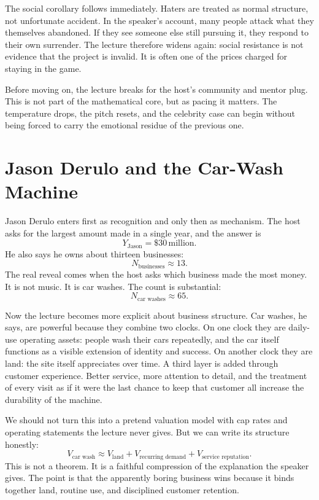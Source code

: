 The social corollary follows immediately. Haters are treated as normal structure, not unfortunate accident. In the speaker's account, many people attack what they themselves abandoned. If they see someone else still pursuing it, they respond to their own surrender. The lecture therefore widens again: social resistance is not evidence that the project is invalid. It is often one of the prices charged for staying in the game.

Before moving on, the lecture breaks for the host's community and mentor plug. This is not part of the mathematical core, but as pacing it matters. The temperature drops, the pitch resets, and the celebrity case can begin without being forced to carry the emotional residue of the previous one.

\section{Jason Derulo and the Car-Wash Machine}

Jason Derulo enters first as recognition and only then as mechanism. The host asks for the largest amount made in a single year, and the answer is
\begin{equation}
Y_{\text{Jason}}=\$30\,\text{million}.
\end{equation}
He also says he owns about thirteen businesses:
\begin{equation}
N_{\text{businesses}}\approx 13.
\end{equation}
The real reveal comes when the host asks which business made the most money. It is not music. It is car washes. The count is substantial:
\begin{equation}
N_{\text{car washes}}\approx 65.
\end{equation}

Now the lecture becomes more explicit about business structure. Car washes, he says, are powerful because they combine two clocks. On one clock they are daily-use operating assets: people wash their cars repeatedly, and the car itself functions as a visible extension of identity and success. On another clock they are land: the site itself appreciates over time. A third layer is added through customer experience. Better service, more attention to detail, and the treatment of every visit as if it were the last chance to keep that customer all increase the durability of the machine.

We should not turn this into a pretend valuation model with cap rates and operating statements the lecture never gives. But we can write its structure honestly:
\begin{equation}
V_{\text{car wash}}
\approx
V_{\text{land}}
+
V_{\text{recurring demand}}
+
V_{\text{service reputation}}.
\end{equation}
This is not a theorem. It is a faithful compression of the explanation the speaker gives. The point is that the apparently boring business wins because it binds together land, routine use, and disciplined customer retention.

